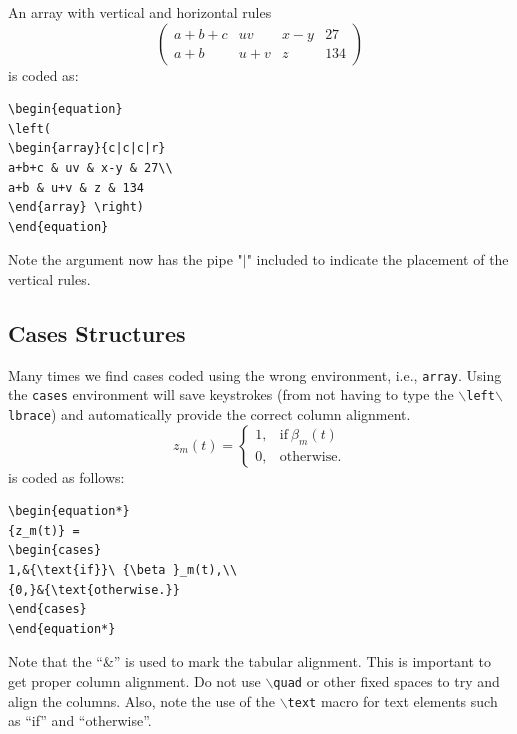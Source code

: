 \documentclass[lettersize,journal]{IEEEtran}
\begin{document}
An array with vertical and horizontal rules
\begin{equation}
\left( \begin{array}{c|c|c|r}
a+b+c & uv & x-y & 27\\ \hline
a+b & u+v & z & 134
\end{array}\right)
\end{equation}
is coded as:
\begin{verbatim}
\begin{equation}
\left(
\begin{array}{c|c|c|r}
a+b+c & uv & x-y & 27\\
a+b & u+v & z & 134
\end{array} \right)
\end{equation}
\end{verbatim}
Note the argument now has the pipe "$\vert$" included to indicate the placement of the vertical rules.


\subsection{Cases Structures}
\noindent Many times we find cases coded using the wrong environment, i.e., {\tt{array}}. Using the {\tt{cases}} environment will save keystrokes (from not having to type the $\backslash${\tt{left}}$\backslash${\tt{lbrace}}) and automatically provide the correct column alignment.
\begin{equation*}
{z_m(t)} = \begin{cases}
1,&{\text{if}}\ {\beta }_m(t) \\ 
{0,}&{\text{otherwise.}} 
\end{cases}
\end{equation*}
\noindent is coded as follows:
\begin{verbatim}
\begin{equation*}
{z_m(t)} = 
\begin{cases}
1,&{\text{if}}\ {\beta }_m(t),\\ 
{0,}&{\text{otherwise.}} 
\end{cases}
\end{equation*}
\end{verbatim}
\noindent Note that the ``\&'' is used to mark the tabular alignment. This is important to get  proper column alignment. Do not use $\backslash${\tt{quad}} or other fixed spaces to try and align the columns. Also, note the use of the $\backslash${\tt{text}} macro for text elements such as ``if'' and ``otherwise''.
\end{document}

